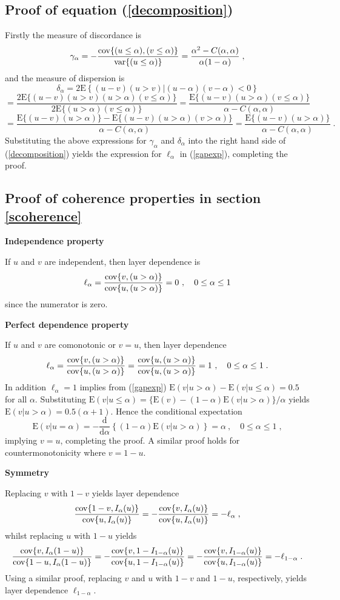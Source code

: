 \documentclass[authoryear]{elsarticle}
\newcommand{\var}{{\rm var}}
\newcommand{\cov}{{\rm cov}}
\newcommand{\E}{{\mathrm E}}
\newcommand{\de}{\mathrm{d}}
\newcommand{\cq}{\ ,\quad }
\newcommand{\eref}[1]{(\ref{#1})}
\newcommand{\aref}[1]{\ref{#1}}
\begin{document}
\subsection{Proof of equation \eref{decomposition}}

Firstly the measure of discordance is
$$
\gamma_\alpha
=-\frac{\cov\{(u\leq\alpha),(v\leq\alpha)\}}{\var\{(u\leq\alpha)\}}
=\frac{\alpha^2-C(\alpha,\alpha)}{\alpha(1-\alpha)}   \;,
$$
and the measure of dispersion is
$$
\delta_\alpha = 2 \E\left\{(u-v)(u>v)|(u-\alpha)(v-\alpha)<0\right\}
$$
$$
=  \frac{2\E\{(u-v)(u>v)(u>\alpha)(v\leq\alpha)\}}{2\E\{(u>\alpha)(v\leq\alpha)\}}
= \frac{\E\{(u-v)(u>\alpha)(v\leq\alpha)\}}{\alpha-C(\alpha,\alpha)}
$$
$$
= \frac{\E\{(u-v)(u>\alpha)\}-\E\{(u-v)(u>\alpha)(v>\alpha)\}}{\alpha-C(\alpha,\alpha)}
 = \frac{\E\{(u-v)(u>\alpha)\}}{\alpha-C(\alpha,\alpha)} \;.
$$
Substituting the above expressions for $\gamma_\alpha$ and $\delta_\alpha$ into the right hand side of \eref{decomposition} yields the expression for $\ell_\alpha$ in \eref{gapexp}, completing the proof.



\subsection{Proof of coherence properties in section \aref{scoherence}}

\textbf{Independence property}

If $u$ and $v$ are independent, then layer dependence is
$$
\ell_\alpha = \frac{\cov\{v,(u>\alpha)\}}{\cov\{u,(u>\alpha)\}}
=0 \cq  0\leq\alpha\leq 1
$$
since the numerator is zero.


\textbf{Perfect dependence property}

If $u$ and $v$ are comonotonic or $v=u$, then layer dependence
$$
\ell_\alpha = \frac{\cov\{v,(u>\alpha)\}}{\cov\{u,(u>\alpha)\}}= \frac{\cov\{u,(u>\alpha)\}}{\cov\{u,(u>\alpha)\}}
=1 \cq  0\leq\alpha\leq 1  \;.
$$
In addition $\ell_\alpha=1$ implies from \eref{gapexp} $\E(v|u>\alpha)-\E(v|u\le\alpha)=0.5$ for all $\alpha$. Substituting $\E(v|u\le\alpha)= \{\E(v)-(1-\alpha)\E(v|u>\alpha)\}/\alpha$ yields $\E(v|u>\alpha)=0.5(\alpha+1)$. Hence the conditional expectation
$$
\E(v|u=\alpha) = - \frac{\de}{\de\alpha} \left\{(1-\alpha)\E(v|u>\alpha) \right\} = \alpha \cq 0\le\alpha\le 1\; ,
$$
implying $v=u$, completing the proof. A similar proof holds for countermonotonicity where $v=1-u$.

\textbf{Symmetry}

Replacing $v$ with $1-v$ yields layer dependence
$$
\frac{\cov\{1-v,I_\alpha(u)\}}{\cov\{u,I_\alpha(u)\}} =
- \frac{\cov\{v,I_\alpha(u)\}}{\cov\{u,I_\alpha(u)\}} = -\ell_\alpha \;,
$$
whilst replacing $u$ with $1-u$ yields
$$
\frac{\cov\{v,I_\alpha(1-u)\}}{\cov\{1-u,I_\alpha(1-u)\}}
=-\frac{\cov\{v,1-I_{1-\alpha}(u)\}}{\cov\{u,1-I_{1-\alpha}(u)\}}
=-\frac{\cov\{v,I_{1-\alpha}(u)\}}{\cov\{u,I_{1-\alpha}(u)\}}
=-\ell_{1-\alpha} \;.
$$
Using a similar proof, replacing $v$ and $u$ with $1-v$ and $1-u$, respectively, yields layer dependence $\ell_{1-\alpha}$.
\end{document}
